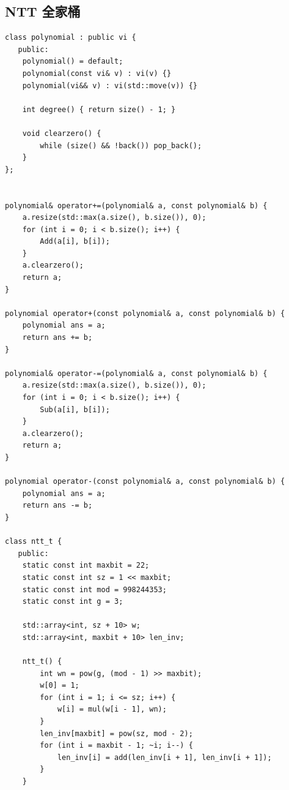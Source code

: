 \documentclass[UTF8, a4paper, titlepage, twoside]{ctexart}
\begin{document}
\subsection{ NTT 全家桶 }
\begin{lstlisting}[style=cpp]
class polynomial : public vi {
   public:
    polynomial() = default;
    polynomial(const vi& v) : vi(v) {}
    polynomial(vi&& v) : vi(std::move(v)) {}

    int degree() { return size() - 1; }

    void clearzero() {
        while (size() && !back()) pop_back();
    }
};


polynomial& operator+=(polynomial& a, const polynomial& b) {
    a.resize(std::max(a.size(), b.size()), 0);
    for (int i = 0; i < b.size(); i++) {
        Add(a[i], b[i]);
    }
    a.clearzero();
    return a;
}

polynomial operator+(const polynomial& a, const polynomial& b) {
    polynomial ans = a;
    return ans += b;
}

polynomial& operator-=(polynomial& a, const polynomial& b) {
    a.resize(std::max(a.size(), b.size()), 0);
    for (int i = 0; i < b.size(); i++) {
        Sub(a[i], b[i]);
    }
    a.clearzero();
    return a;
}

polynomial operator-(const polynomial& a, const polynomial& b) {
    polynomial ans = a;
    return ans -= b;
}

class ntt_t {
   public:
    static const int maxbit = 22;
    static const int sz = 1 << maxbit;
    static const int mod = 998244353;
    static const int g = 3;

    std::array<int, sz + 10> w;
    std::array<int, maxbit + 10> len_inv;

    ntt_t() {
        int wn = pow(g, (mod - 1) >> maxbit);
        w[0] = 1;
        for (int i = 1; i <= sz; i++) {
            w[i] = mul(w[i - 1], wn);
        }
        len_inv[maxbit] = pow(sz, mod - 2);
        for (int i = maxbit - 1; ~i; i--) {
            len_inv[i] = add(len_inv[i + 1], len_inv[i + 1]);
        }
    }


\end{lstlisting}
\end{document}
